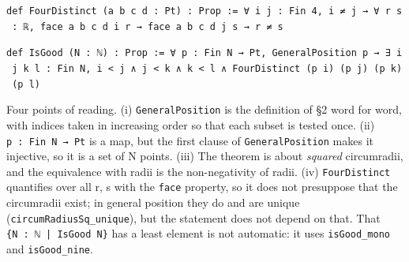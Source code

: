 \documentclass[11pt,a4paper]{article}
\theoremstyle{named}
\begin{document}
\begin{leancode}
\item \texttt{def\ \allowbreak{}FourDistinct\ \allowbreak{}(a\ \allowbreak{}b\ \allowbreak{}c\ \allowbreak{}d\ \allowbreak{}:\ \allowbreak{}Pt)\ \allowbreak{}:\ \allowbreak{}Prop\ \allowbreak{}:=\ \allowbreak{}∀\ \allowbreak{}i\ \allowbreak{}j\ \allowbreak{}:\ \allowbreak{}Fin\ \allowbreak{}4,\ \allowbreak{}i\ \allowbreak{}≠\ \allowbreak{}j\ \allowbreak{}→\ \allowbreak{}∀\ \allowbreak{}r\ \allowbreak{}s\ \allowbreak{}:\ \allowbreak{}ℝ,\ \allowbreak{}face\ \allowbreak{}a\ \allowbreak{}b\ \allowbreak{}c\ \allowbreak{}d\ \allowbreak{}i\ \allowbreak{}r\ \allowbreak{}→\ \allowbreak{}face\ \allowbreak{}a\ \allowbreak{}b\ \allowbreak{}c\ \allowbreak{}d\ \allowbreak{}j\ \allowbreak{}s\ \allowbreak{}→\ \allowbreak{}r\ \allowbreak{}≠\ \allowbreak{}s}
\item \texttt{def\ \allowbreak{}IsGood\ \allowbreak{}(N\ \allowbreak{}:\ \allowbreak{}ℕ)\ \allowbreak{}:\ \allowbreak{}Prop\ \allowbreak{}:=\ \allowbreak{}∀\ \allowbreak{}p\ \allowbreak{}:\ \allowbreak{}Fin\ \allowbreak{}N\ \allowbreak{}→\ \allowbreak{}Pt,\ \allowbreak{}GeneralPosition\ \allowbreak{}p\ \allowbreak{}→\ \allowbreak{}∃\ \allowbreak{}i\ \allowbreak{}j\ \allowbreak{}k\ \allowbreak{}l\ \allowbreak{}:\ \allowbreak{}Fin\ \allowbreak{}N,\ \allowbreak{}i\ \allowbreak{}\textless{}\ \allowbreak{}j\ \allowbreak{}∧\ \allowbreak{}j\ \allowbreak{}\textless{}\ \allowbreak{}k\ \allowbreak{}∧\ \allowbreak{}k\ \allowbreak{}\textless{}\ \allowbreak{}l\ \allowbreak{}∧\ \allowbreak{}FourDistinct\ \allowbreak{}(p\ \allowbreak{}i)\ \allowbreak{}(p\ \allowbreak{}j)\ \allowbreak{}(p\ \allowbreak{}k)\ \allowbreak{}(p\ \allowbreak{}l)}
\end{leancode}

Four points of reading. (i) \texttt{GeneralPosition} is the definition of §2 word for word, with indices taken in increasing order so that each subset is tested once. (ii) \texttt{p\ \allowbreak{}:\ \allowbreak{}Fin\ \allowbreak{}N\ \allowbreak{}→\ \allowbreak{}Pt} is a map, but the first clause of \texttt{GeneralPosition} makes it injective, so it is a set of N points. (iii) The theorem is about \textit{squared} circumradii, and the equivalence with radii is the non-negativity of radii. (iv) \texttt{FourDistinct} quantifies over all r, s with the \texttt{face} property, so it does not presuppose that the circumradii exist; in general position they do and are unique (\texttt{circumRadiusSq\_\allowbreak{}unique}), but the statement does not depend on that. That \texttt{\{N\ \allowbreak{}:\ \allowbreak{}ℕ\ \allowbreak{}|\ \allowbreak{}IsGood\ \allowbreak{}N\}} has a least element is not automatic: it uses \texttt{isGood\_\allowbreak{}mono} and \texttt{isGood\_\allowbreak{}nine}.
\end{document}
